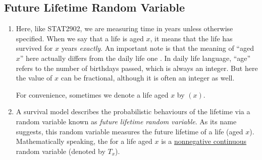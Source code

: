 \subsection{Future Lifetime Random Variable}
\begin{enumerate}
\item Here, like STAT2902, we are measuring time in years unless otherwise
specified. When we say that a life is aged \(x\), it means that the life has
survived for \(x\) years \emph{exactly}. An important note is that the meaning
of ``aged \(x\)'' here actually differs from the daily life one \warn{}. In
daily life language, ``age'' refers to the number of birthdays
 passed, which is always an integer. But here the value
of \(x\) can be fractional, although it is often an integer as well.

\begin{center}
\end{center}

For convenience, sometimes we denote a life aged \(x\) by \((x)\).

\item A survival model describes the probabilistic behaviours of the lifetime
via a random variable known as \emph{future lifetime random variable}. As its
name suggests, this random variable measures the future lifetime of a life
(aged \(x\)). Mathematically speaking, the  for a life aged \(x\) is a \underline{nonnegative continuous} random
variable (denoted by \(T_x\)).


\end{enumerate}

